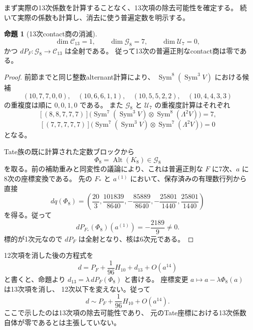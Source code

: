 \documentclass[a4paper,11pt]{ltjsarticle}
\theoremstyle{definition}
\newtheorem{proposition}[theorem]{命題}
\begin{document}
まず実際の13次係数を計算することなく、13次項の除去可能性を確定する。
続いて実際の係数も計算し、消去に使う普遍定数を明示する。
\begin{proposition}[13次contact商の消滅]
\label{prop:v10-degree-thirteen}
\[
 \dim\mathcal C_{13}=1,\qquad
 \dim\mathcal G_8=7,\qquad
 \dim\mathcal U_7=0,
\]
かつ $dP_F\colon\mathcal G_8\to\mathcal C_{13}$ は全射である。
従って13次の普遍正則なcontact商は零である。
\end{proposition}
\begin{proof}
前節までと同じ整数alternant計算により、
$\operatorname{Sym}^8(\operatorname{Sym}^3V)$ における候補
\[
 (10,7,7,0,0),\quad(10,6,6,1,1),\quad
 (10,5,5,2,2),\quad(10,4,4,3,3)
\]
の重複度は順に $0,0,1,0$ である。
また $\mathcal G_8$ と $\mathcal U_7$ の重複度計算はそれぞれ
\[
 [(8,8,7,7,7)]\bigl(
 \operatorname{Sym}^7(\operatorname{Sym}^3V)
 \otimes\operatorname{Sym}^8(\Lambda^2V)\bigr)=7,
\]
\[
 [(7,7,7,7,7)]\bigl(
 \operatorname{Sym}^7(\operatorname{Sym}^3V)
 \otimes\operatorname{Sym}^7(\Lambda^2V)\bigr)=0
\]
となる。

Tate族の既に計算された定数ブロックから
\[
 \Phi_8=\operatorname{Alt}(K_8)\in\mathcal G_8
\]
を取る。前の補助重みと同変性の議論により、これは普遍正則な
$F$ に7次、$a$ に8次の座標変換である。
先の $F_*$ と $a^{(1)}$ において、保存済みの有理数行列から直接
\[
 dq(\Phi_8)=
 \left(\frac{20}{3},\frac{101839}{8640},
 -\frac{85889}{8640},-\frac{25801}{1440},
 \frac{25801}{1440}\right)
\]
を得る。従って
\[
 \boxed{dP_{F_*}(\Phi_8)(a^{(1)})=-\frac{2189}{9}\ne0.}
\]
標的が1次元なので $dP_F$ は全射となり、核は6次元である。
\end{proof}

12次項を消した後の方程式を
\[
 d=P_F+\frac1{96}H_{10}+d_{13}+O(a^{14})
\]
と書くと、命題より $d_{13}=\lambda\,dP_F(\Phi_8)$ と書ける。
座標変更 $a\mapsto a-\lambda\Phi_8(a)$ は13次項を消し、
12次以下を変えない。従って
\[
 \boxed{d\sim P_F+\frac1{96}H_{10}+O(a^{14}).}
\]
ここで示したのは13次項の除去可能性であり、
元のTate座標における13次係数自体が零であるとは主張していない。
\end{document}
